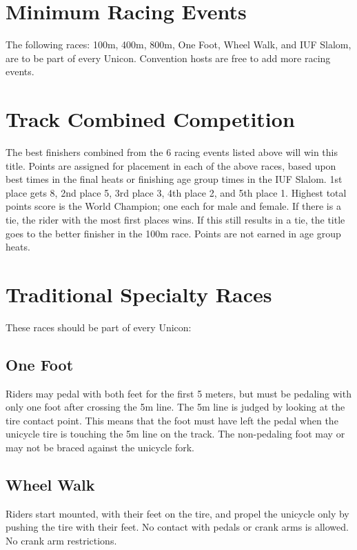 \section{Minimum Racing Events \label{sec:racing_minimum-racing-events}}
The following races: 100m, 400m, 800m, One Foot, Wheel Walk, and IUF Slalom, are to be part of every Unicon.
Convention hosts are free to add more racing events.

\section{Track Combined Competition}
The best finishers combined from the 6 racing events listed above will win this title.
Points are assigned for placement in each of the above races, based upon best times in the final heats or finishing age group times in the IUF Slalom.
1st place gets 8, 2nd place 5, 3rd place 3, 4th place 2, and 5th place 1.
Highest total points score is the World Champion; one each for male and female.
If there is a tie, the rider with the most first places wins.
If this still results in a tie, the title goes to the better finisher in the 100m race.
Points are not earned in age group heats.

\section{Traditional Specialty Races}
These races should be part of every Unicon:

\subsection{One Foot}
Riders may pedal with both feet for the first 5 meters, but must be pedaling with only one foot after crossing the 5m line.
The 5m line is judged by looking at the tire contact point.
This means that the foot must have left the pedal when the unicycle tire is touching the 5m line on the track.
The non-pedaling foot may or may not be braced against the unicycle fork.

\subsection{Wheel Walk}
Riders start mounted, with their feet on the tire, and propel the unicycle only by pushing the tire with their feet.
No contact with pedals or crank arms is allowed.
No crank arm restrictions.


